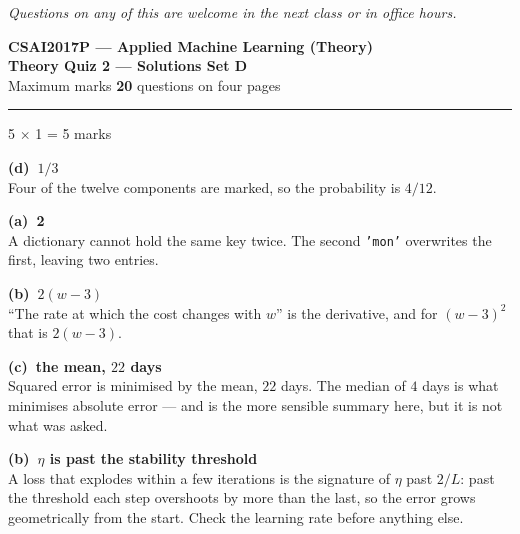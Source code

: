 \documentclass[10pt,a4paper]{article}
\newcommand{\SetLetter}{}
\newcommand{\parthead}[2]{\vspace{2pt}\noindent\rule{\linewidth}{0.4pt}\par\vspace{2pt}%
  \noindent{\bfseries Part #1}\hfill{\small #2}\par\vspace{1pt}}
\newcommand{\sol}[1]{\textbf{#1}}
\begin{document}
\vfill

{\footnotesize\itshape Questions on any of this are welcome in the next class or in office hours.}

\newpage


\renewcommand{\SetLetter}{D}\setcounter{page}{1}

\begin{center}
{\large\bfseries CSAI2017P --- Applied Machine Learning (Theory)}\\[2pt]
{\large\bfseries Theory Quiz 2 --- Solutions \quad\textbullet\quad Set D}\\[3pt]
{\small Maximum marks \textbf{20} \quad\textbullet{} questions on four pages}
\end{center}
\vspace{2pt}

\noindent{}
\vspace{3pt}


\parthead{A --- Multiple choice}{5 $\times$ 1 = 5 marks}

\begin{sA}

  \item \sol{(d)\ $1/3$}\\ Four of the twelve components are marked, so the probability is $4/12$.

  \item \sol{(a)\ 2}\\ A dictionary cannot hold the same key twice. The second \texttt{'mon'} overwrites the first, leaving two entries.

  \item \sol{(b)\ $2(w-3)$}\\ ``The rate at which the cost changes with $w$'' is the derivative, and for $(w-3)^2$ that is $2(w-3)$.

  \item \sol{(c)\ the mean, $22$ days}\\ Squared error is minimised by the mean, $22$ days. The median of $4$ days is what minimises absolute error --- and is the more sensible summary here, but it is not what was asked.

  \item \sol{(b)\ $\eta$ is past the stability threshold}\\ A loss that explodes within a few iterations is the signature of $\eta$ past $2/L$: past the threshold each step overshoots by more than the last, so the error grows geometrically from the start. Check the learning rate before anything else.

\end{sA}
\end{document}
